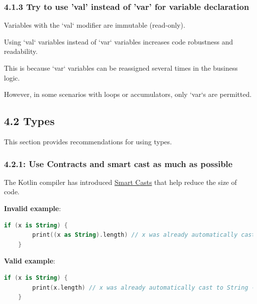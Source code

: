 {{{{\subsubsection*{\textbf{4.1.3 Try to use 'val' instead of 'var' for variable declaration}}
\leavevmode\newline

\label{sec:4.1.3}



Variables with the `val` modifier are immutable (read-only).

Using `val` variables instead of `var` variables increases code robustness and readability.

This is because `var` variables can be reassigned several times in the business logic.

However, in some scenarios with loops or accumulators, only `var`s are permitted.



\subsection*{\textbf{4.2 Types}}

\label{sec:4.2}

This section provides recommendations for using types.

\subsubsection*{\textbf{4.2.1: Use Contracts and smart cast as much as possible}}
\leavevmode\newline

\label{sec:4.2.1}



The Kotlin compiler has introduced \href{https://kotlinlang.org/docs/reference/typecasts.html#smart-casts}{Smart Casts} that help reduce the size of code.



\textbf{Invalid example}:

\begin{lstlisting}[language=Kotlin]
    if (x is String) {
        print((x as String).length) // x was already automatically cast to String - no need to use 'as' keyword here
    }
\end{lstlisting}


\textbf{Valid example}:

\begin{lstlisting}[language=Kotlin]
    if (x is String) {
        print(x.length) // x was already automatically cast to String - no need to use 'as' keyword here
    }
\end{lstlisting}


}}}}

